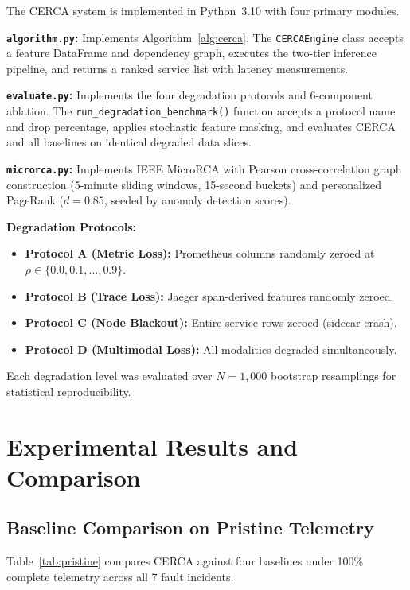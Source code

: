\documentclass[conference]{IEEEtran}
\begin{document}
The CERCA system is implemented in Python~3.10 with four primary modules.

\textbf{\texttt{algorithm.py}:} Implements Algorithm~\ref{alg:cerca}. The \texttt{CERCAEngine} class accepts a feature DataFrame and dependency graph, executes the two-tier inference pipeline, and returns a ranked service list with latency measurements.

\textbf{\texttt{evaluate.py}:} Implements the four degradation protocols and 6-component ablation. The \texttt{run\_degradation\_benchmark()} function accepts a protocol name and drop percentage, applies stochastic feature masking, and evaluates CERCA and all baselines on identical degraded data slices.

\textbf{\texttt{microrca.py}:} Implements IEEE MicroRCA \cite{wu2020} with Pearson cross-correlation graph construction (5-minute sliding windows, 15-second buckets) and personalized PageRank ($d = 0.85$, seeded by anomaly detection scores).

\textbf{Degradation Protocols:}
\begin{itemize}
    \item \textbf{Protocol A (Metric Loss):} Prometheus columns randomly zeroed at $\rho \in \{0.0, 0.1, \ldots, 0.9\}$.
    \item \textbf{Protocol B (Trace Loss):} Jaeger span-derived features randomly zeroed.
    \item \textbf{Protocol C (Node Blackout):} Entire service rows zeroed (sidecar crash).
    \item \textbf{Protocol D (Multimodal Loss):} All modalities degraded simultaneously.
\end{itemize}

Each degradation level was evaluated over $N = 1{,}000$ bootstrap resamplings for statistical reproducibility.

\section{Experimental Results and Comparison}

\subsection{Baseline Comparison on Pristine Telemetry}

Table~\ref{tab:pristine} compares CERCA against four baselines under 100\% complete telemetry across all 7 fault incidents.
\end{document}
